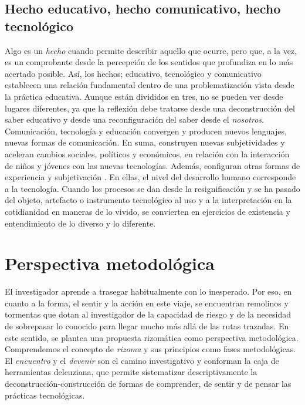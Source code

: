 \documentclass{textolivre}
\begin{document}
\subsection{Hecho educativo, hecho comunicativo, hecho tecnológico}\label{sec-hecho}
Algo es un \textit{hecho} cuando permite describir aquello que ocurre, pero que, a la vez, es un comprobante desde la percepción de los sentidos que profundiza en lo más acertado posible. Así, los hechos; educativo, tecnológico y comunicativo establecen una relación fundamental dentro de una problematización vista desde la práctica educativa. Aunque están divididos en tres, no se pueden ver desde lugares diferentes, ya que la reflexión debe tratarse desde una deconstrucción del saber educativo y desde una reconfiguración del saber desde el \textit{nosotros}. Comunicación, tecnología y educación \cite{mejia_comunicacion_2011b} convergen y producen nuevos lenguajes, nuevas formas de comunicación. En suma, construyen nuevas subjetividades y aceleran cambios sociales, políticos y económicos, en relación con la interacción de niños y jóvenes con las nuevas tecnologías. Además, configuran otras formas de experiencia y subjetivación \cite{munoz_culturas_2010a, ramirez_cabanzo_infancias_2013}. En ellas, el nivel del desarrollo humano corresponde a la tecnología. Cuando los procesos se dan desde la resignificación y se ha pasado del objeto, artefacto o instrumento tecnológico al uso y a la interpretación en la cotidianidad en maneras de lo vivido, se convierten en ejercicios de existencia y entendimiento de lo diverso y lo diferente.

\section{Perspectiva metodológica}\label{sec-perspectiva}
El investigador aprende a trasegar habitualmente con lo inesperado. Por eso, en cuanto a la forma, el sentir y la acción en este viaje, se encuentran remolinos y tormentas que dotan al investigador de la capacidad de riesgo y de la necesidad de sobrepasar lo conocido para llegar mucho más allá de las rutas trazadas. En este sentido, se plantea una propuesta rizomática como perspectiva metodológica. Comprendemos el concepto de \textit{rizoma} y sus principios como fases metodológicas. El \textit{encuentro} y el \textit{devenir} son el camino investigativo y conforman la caja de herramientas deleuziana, que permite sistematizar descriptivamente la deconstrucción-construcción de formas de comprender, de sentir y de pensar las prácticas tecnológicas. 
\end{document}
